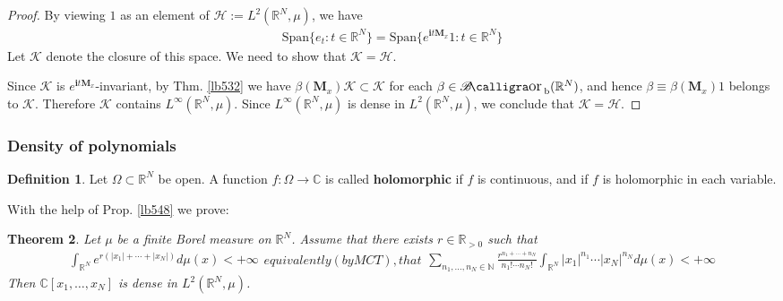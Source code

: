 \documentclass[12pt,b5paper,notitlepage]{article}
\theoremstyle{definition}
\newtheorem{df}{Definition}[subsection]
\theoremstyle{plain}
\newtheorem{thm}[df]{Theorem}
\DeclareMathOperator{\Borb}{{\mathscr{B}\text{\kern -2pt {\calligra\large or}}\,}_{\mathrm b}}
\newcommand{\Span}{\mathrm{Span}}
\newcommand{\im}{\mathbf{i}}
\newcommand{\Cbb}{\mathbb C}
\newcommand{\Nbb}{\mathbb N}
\newcommand{\Rbb}{\mathbb R}
\newcommand{\MH}{\mathcal H}
\newcommand{\MK}{\mathcal K}
\newcommand{\Mbf}{\mathbf M}
\numberwithin{equation}{section}
\begin{document}
\begin{proof}
By viewing $1$ as an element of $\MH:=L^2(\Rbb^N,\mu)$, we have
\begin{align*}
\Span\{e_t:t\in\Rbb^N\}=\Span\{e^{\im t\Mbf_x}1:t\in\Rbb^N\}
\end{align*}
Let $\MK$ denote the closure of this space. We need to show that $\MK=\MH$.


Since $\MK$ is $e^{\im t\Mbf_x}$-invariant, by Thm. \ref{lb532} we have $\beta(\Mbf_x)\MK\subset\MK$ for each $\beta\in\Borb(\Rbb^N)$, and hence $\beta\equiv\beta(\Mbf_x)1$ belongs to $\MK$. Therefore $\MK$ contains $L^\infty(\Rbb^N,\mu)$. Since $L^\infty(\Rbb^N,\mu)$ is dense in $L^2(\Rbb^N,\mu)$, we conclude that $\MK=\MH$.
\end{proof}



\subsubsection{Density of polynomials}


\begin{df}
Let $\Omega\subset\Rbb^N$ be open. A function $f:\Omega\rightarrow\Cbb$ is called \textbf{holomorphic}  if $f$ is continuous, and if $f$ is holomorphic in each variable.
\end{df}


With the help of Prop. \ref{lb548} we prove:


\begin{thm}\label{lb547}
Let $\mu$ be a finite Borel measure on $\Rbb^N$. Assume that there exists $r\in\Rbb_{>0}$ such that
\begin{subequations}\label{eq267}
\begin{align}\label{eq264}
\int_{\Rbb^N} e^{r(|x_1|+\cdots+|x_N|)}d\mu(x)<+\infty
\end{align}
equivalently (by MCT), that
\begin{align}\label{eq266}
\sum_{n_1,\dots,n_N\in\Nbb}\frac{r^{n_1+\cdots+n_N}}{n_1!\cdots n_N!}\int_{\Rbb^N}|x_1|^{n_1}\cdots|x_N|^{n_N}d\mu(x)<+\infty
\end{align}
\end{subequations}
Then $\Cbb[x_1,\dots,x_N]$ is dense in $L^2(\Rbb^N,\mu)$.
\end{thm}
\end{document}
